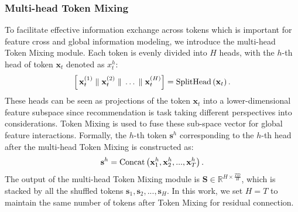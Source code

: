 
    
    
  \subsubsection{Multi-head Token Mixing}

    To facilitate effective information exchange across tokens which is important for feature cross and global information modeling, we introduce the multi-head Token Mixing module.
    Each token is evenly divided into $H$ heads, with the $h$-th head of token $\mathbf{x}_t$ denoted as $x_t^h$:
    \begin{equation}
        \Bigl[\,
             \mathbf{x}_t^{(1)}
             \;\Vert\;
             \mathbf{x}_t^{(2)}
             \;\Vert\;\dots\;\Vert\;
             \mathbf{x}_t^{(H)}
            \Bigr] = {\rm SplitHead} \left( \mathbf{x}_t \right). 
    \end{equation}
    These heads can be seen as projections of the token $\mathbf{x}_t$ into a lower-dimensional feature subspace since recommendation is task taking different perspectives into considerations.
    Token Mixing is used to fuse these sub-space vector for global feature interactions. Formally, the $h$-th token $\mathbf{s}^{h}$ corresponding to the $h$-th head after the multi-head Token Mixing is constructed as:
    \begin{equation}
        \mathbf{s}^{h} = {\rm Concat}\left( \mathbf{x}_1^{h}, \mathbf{x}_2^{h}, ..., \mathbf{x}_T^{h} \right).
    \end{equation}
    The output of the multi-head Token Mixing module is $\mathbf{S} \in \mathbb{R}^{H \times \frac{TD}{H}}$, which is stacked by all the shuffled tokens $\mathbf{s}_{1}, \mathbf{s}_{2}, ..., \mathbf{s}_{H}$. In this work, we set $H=T$ to maintain the same number of tokens after Token Mixing for residual connection.

